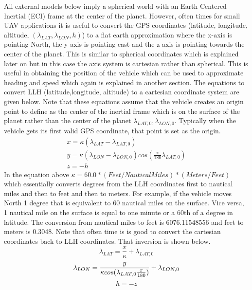 All external models below imply a spherical world with an Earth Centered Inertial (ECI) frame at the center of the planet. However, often times for small UAV applications it is useful to convert the GPS coordinates (latitude, longitude, altitude, $(\lambda_{LAT},\lambda_{LON},h)$) to a flat earth approximation where the x-axis is pointing North, the y-axis is pointing east and the z-axis is pointing towards the center of the planet. This is similar to spherical coordinates which is explained later on but in this case the axis system is cartesian rather than spherical. This is useful in obtaining the position of the vehicle which can be used to approximate heading and speed which again is explained in another section. The equations to convert LLH (latitude,longitude, altitude) to a cartesian coordinate system are given below. Note that these equations assume that the vehicle creates an origin point to define as the center of the inertial frame which is on the surface of the planet rather than the center of the planet $\lambda_{LAT,0},\lambda_{LON,0}$. Typically when the vehicle gets its first valid GPS coordinate, that point is set as the origin.
\begin{equation}
\begin{matrix}
x = \kappa (\lambda_{LAT} - \lambda_{LAT,0}) \\
y = \kappa (\lambda_{LON} - \lambda_{LON,0}) cos(\frac{\pi}{180}\lambda_{LAT,0}) \\
z = -h
\end{matrix}
\end{equation}
In the equation above $\kappa = 60.0*(Feet/NauticalMiles)*(Meters/Feet)$ which essentially converts degrees from the LLH coordinates first to nautical miles and then to feet and then to meters. For example, if the vehicle moves North 1 degree that is equivalent to 60 nautical miles on the surface. Vice versa, 1 nautical mile on the surface is equal to one minute or a 60th of a degree in latitude. The conversion from nautical miles to feet is 6076.11548556 and feet to meters is 0.3048. Note that often time is is good to convert the cartesian coordinates back to LLH coordinates. That inversion is shown below.
\begin{equation}
\lambda_{LAT} = \frac{x}{\kappa} + \lambda_{LAT,0}
\end{equation}
\begin{equation}
\lambda_{LON} = \frac{y}{\kappa cos(\lambda_{LAT,0} \frac{\pi}{180})} + \lambda_{LON,0}\\
\end{equation}
\begin{equation}
h = -z
\end{equation}

